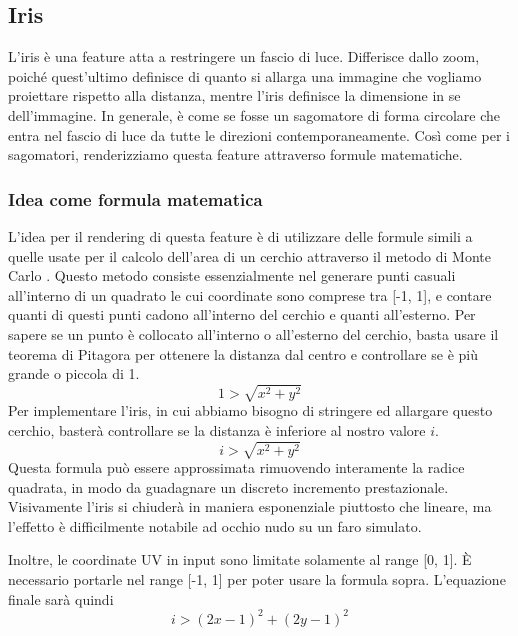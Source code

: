 \documentclass[main.tex]{subfiles}
\begin{document}
\subsection{Iris}\label{subsec:5_Iris}
L'iris è una feature atta a restringere un fascio di luce. Differisce dallo zoom, poiché quest'ultimo definisce di quanto si allarga una immagine che vogliamo proiettare rispetto alla distanza, mentre l'iris definisce la dimensione in se dell'immagine. In generale, è come se fosse un sagomatore di forma circolare che entra nel fascio di luce da tutte le direzioni contemporaneamente. Così come per i sagomatori, renderizziamo questa feature attraverso formule matematiche.

\subsubsection{Idea come formula matematica}\label{subsec:5_2_IrisMath}
L'idea per il rendering di questa feature è di utilizzare delle formule simili a quelle usate per il calcolo dell'area di un cerchio attraverso il metodo di Monte Carlo \cite{circleMonteCarlo}. Questo metodo consiste essenzialmente nel generare punti casuali all'interno di un quadrato le cui coordinate sono comprese tra [-1, 1], e contare quanti di questi punti cadono all'interno del cerchio e quanti all'esterno. Per sapere se un punto è collocato all'interno o all'esterno del cerchio, basta usare il teorema di Pitagora per ottenere la distanza dal centro e controllare se è più grande o piccola di 1.
\[1 > \sqrt{x^2 + y^2}\]
Per implementare l'iris, in cui abbiamo bisogno di stringere ed allargare questo cerchio, basterà controllare se la distanza è inferiore al nostro valore $i$.
\[i > \sqrt{x^2 + y^2}\]
Questa formula può essere approssimata rimuovendo interamente la radice quadrata, in modo da guadagnare un discreto incremento prestazionale. Visivamente l'iris si chiuderà in maniera esponenziale piuttosto che lineare, ma l'effetto è difficilmente notabile ad occhio nudo su un faro simulato. 

Inoltre, le coordinate UV in input sono limitate solamente al range [0, 1]. È necessario portarle nel range [-1, 1] per poter usare la formula sopra. L'equazione finale sarà quindi
\[i > (2x - 1)^2 + (2y - 1)^2\]
\newline
\end{document}
